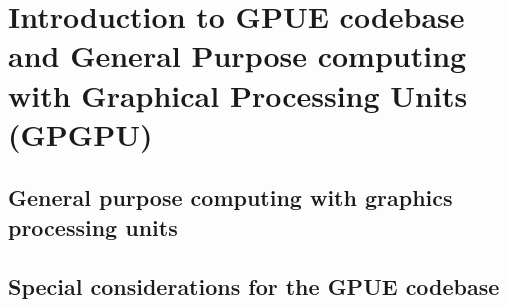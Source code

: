 
\chapter{Introduction to GPUE codebase and General Purpose computing with Graphical Processing Units (GPGPU)} \label{ch-gpu}


\section{General purpose computing with graphics processing units}
\section{Special considerations for the GPUE codebase}
